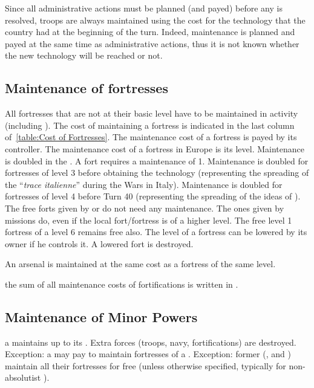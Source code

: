 \begin{designnote}
  Since all administrative actions must be planned (and payed) before any is
  resolved, troops are always maintained using the cost for the technology
  that the country had at the beginning of the turn. Indeed, maintenance is
  planned and payed at the same time as administrative actions, thus it is not
  known whether the new technology will be reached or not.
\end{designnote}



\subsection{Maintenance of fortresses}

\aparag All fortresses that are not at their basic level have to be maintained
in activity (including \Presidios). The cost of maintaining a fortress is
indicated in the last column of~\ref{table:Cost of Fortresses}.
\bparag The maintenance cost of a fortress is payed by its controller.
\bparag The maintenance cost of a fortress in Europe is its level.
\bparag Maintenance is doubled in the \ROTW. A fort requires a maintenance of
1\ducats.
\bparag Maintenance is doubled for fortresses of level 3 before obtaining the
technology \TARQ (representing the spreading of the ``\emph{trace italienne}''
during the Wars in Italy).
\bparag Maintenance is doubled for fortresses of level 4 before Turn 40
(representing the spreading of the ideas of ).
\bparag The free forts given by \TP or \COL do not need any maintenance. The
ones given by missions do, even if the local fort/fortress is of a higher
level. The free level 1 fortress of a level 6 \COL remains free also.
\bparag The level of a fortress can be lowered by its owner if he controls
it. A lowered fort is destroyed.

\aparag[Arsenals] An arsenal is maintained at the same cost as a fortress of
the same level.

\aparag the sum of all maintenance costs of fortifications is written in
.




\subsection{Maintenance of Minor Powers}
\label{chLogistic:Maintenance of minors}
\aparag[At peace] a \MIN maintains up to its . Extra
forces (troops, navy, fortifications) are destroyed.
\bparag Exception: a \MAJ may pay to maintain fortresses of a \VASSAL.
\bparag Exception: former \MAJ (\paysPortugal, \paysVenise and \paysPologne)
maintain all their fortresses for free (unless otherwise specified, typically
for non-absolutist \paysPologne).

